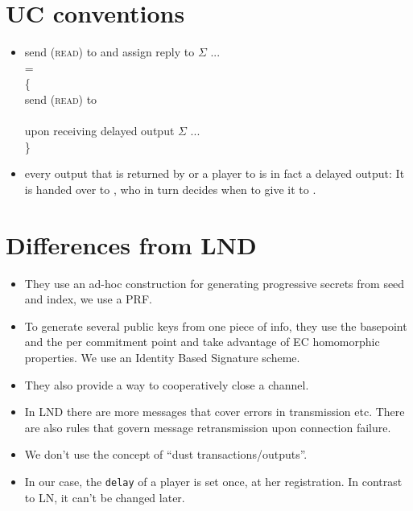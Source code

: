 \section{UC conventions}
  \begin{itemize}
    \item send (\textsc{read}) to \ledger{} and assign reply to $\Sigma$ ... \\
    = \\
    \{ \\
    send (\textsc{read}) to \ledger{} \\ \ \\
    upon receiving delayed output $\Sigma$ ... \\
    \}
    \item every output that is returned by \fpaynet{} or a player to
    \environment{} is in fact a delayed output: It is handed over to
    \adversary{}, who in turn decides when to give it to \environment{}.
  \end{itemize}

\section{Differences from LND}
  \begin{itemize}
    \item They use an ad-hoc construction for generating progressive secrets
    from seed and index, we use a PRF.
    \item To generate several public keys from one piece of info, they use the
    basepoint and the per commitment point and take advantage of EC homomorphic
    properties. We use an Identity Based Signature scheme.
    \item They also provide a way to cooperatively close a channel. 
    \item In LND there are more messages that cover errors in transmission etc.
    There are also rules that govern message retransmission upon connection
    failure.
    \item We don't use the concept of ``dust transactions/outputs''.
    \item In our case, the \texttt{delay} of a player is set once, at her
    registration. In contrast to LN, it can't be changed later.
  \end{itemize}
